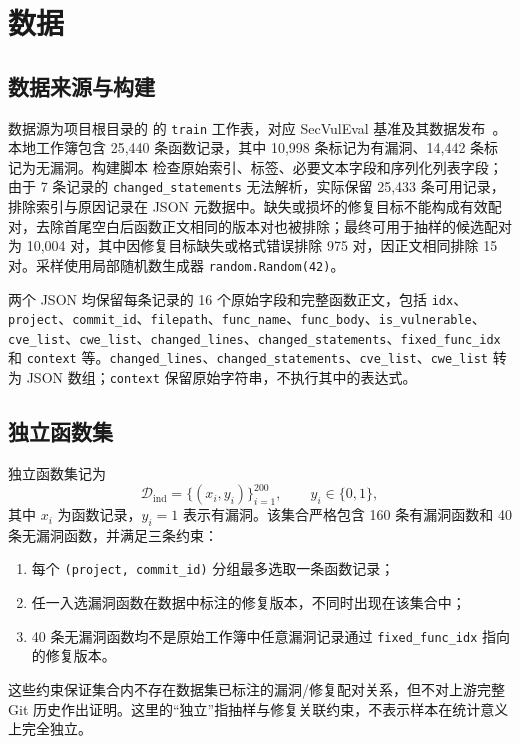 \documentclass[conference]{IEEEtran}
\newcommand{\Dind}{\mathcal{D}_{\mathrm{ind}}}
\begin{document}
\section{数据}
\label{sec:data}

\subsection{数据来源与构建}
数据源为项目根目录的  的 \texttt{train} 工作表，对应 SecVulEval 基准及其数据发布~\cite{ahmed2026secvuleval,secvulevaldata}。本地工作簿包含 25{,}440 条函数记录，其中 10{,}998 条标记为有漏洞、14{,}442 条标记为无漏洞。构建脚本  检查原始索引、标签、必要文本字段和序列化列表字段；由于 7 条记录的 \texttt{changed\_statements} 无法解析，实际保留 25{,}433 条可用记录，排除索引与原因记录在 JSON 元数据中。缺失或损坏的修复目标不能构成有效配对，去除首尾空白后函数正文相同的版本对也被排除；最终可用于抽样的候选配对为 10{,}004 对，其中因修复目标缺失或格式错误排除 975 对，因正文相同排除 15 对。采样使用局部随机数生成器 \texttt{random.Random(42)}。

两个 JSON 均保留每条记录的 16 个原始字段和完整函数正文，包括 \texttt{idx}、\texttt{project}、\texttt{commit\_id}、\texttt{filepath}、\texttt{func\_name}、\texttt{func\_body}、\texttt{is\_vulnerable}、\texttt{cve\_list}、\texttt{cwe\_list}、\texttt{changed\_lines}、\texttt{changed\_statements}、\texttt{fixed\_func\_idx} 和 \texttt{context} 等。\texttt{changed\_lines}、\texttt{changed\_statements}、\texttt{cve\_list}、\texttt{cwe\_list} 转为 JSON 数组；\texttt{context} 保留原始字符串，不执行其中的表达式。

\subsection{独立函数集}
独立函数集记为
\begin{equation}
\Dind=\{(x_i,y_i)\}_{i=1}^{200},\qquad y_i\in\{0,1\},
\end{equation}
其中 $x_i$ 为函数记录，$y_i=1$ 表示有漏洞。该集合严格包含 160 条有漏洞函数和 40 条无漏洞函数，并满足三条约束：
\begin{enumerate}
    \item 每个 \texttt{(project, commit\_id)} 分组最多选取一条函数记录；
    \item 任一入选漏洞函数在数据中标注的修复版本，不同时出现在该集合中；
    \item 40 条无漏洞函数均不是原始工作簿中任意漏洞记录通过 \texttt{fixed\_func\_idx} 指向的修复版本。
\end{enumerate}
这些约束保证集合内不存在数据集已标注的漏洞/修复配对关系，但不对上游完整 Git 历史作出证明。这里的“独立”指抽样与修复关联约束，不表示样本在统计意义上完全独立。
\end{document}
